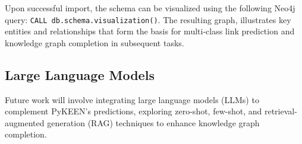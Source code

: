 Upon successful import, the schema can be visualized using the following Neo4j query: \texttt{CALL db.schema.visualization()}. The resulting graph, illustrates key entities and relationships that form the basis for multi-class link prediction and knowledge graph completion in subsequent tasks.

\subsection*{Large Language Models}


Future work will involve integrating large language models (LLMs) to complement PyKEEN's predictions, exploring zero-shot, few-shot, and retrieval-augmented generation (RAG) techniques to enhance knowledge graph completion.
